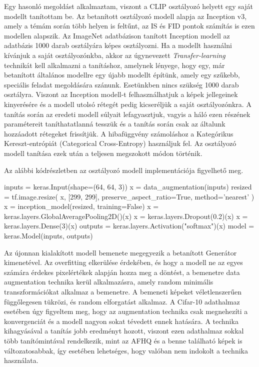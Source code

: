Egy hasonló megoldást alkalmaztam, viszont a CLIP osztályozó helyett egy saját modellt tanítottam be. Az betanított osztályozó modell alapja az Inception v3, amely a témám során több helyen is feltűnt, az IS és FID pontok számítás is ezen modellen alapszik. Az ImageNet \cite{deng2009imagenet} adatbázison tanított Inception modell az adatbázis 1000 darab osztályára képes osztályozni. Ha a modellt használni kívánjuk a saját osztályozónkba, akkor az úgynevezett \textit{Transfer-learning} technikát kell alkalmazni a tanításhoz, amelynek lényege, hogy egy, már betanított általános modellre egy újabb modellt építünk, amely egy szűkebb, speciális feladat megoldására szánunk. Esetünkben nincs szükség 1000 darab osztályra. Viszont az Inception modell-t felhasználhatjuk a képek jellegeinek kinyerésére és a modell utolsó rétegét pedig kicseréljük a saját osztályozónkra.
A tanítás során az eredeti modell súlyait lefagyasztjuk, vagyis a háló ezen részének paramétereit taníthatatlanná tesszük és a tanítás során csak az általunk hozzáadott rétegeket frissítjük.
A hibafüggvény számoláshoz a Kategórikus Kereszt-entrópiát (Categorical Cross-Entropy) használjuk fel. Az osztályozó modell tanítása ezek után a teljesen megszokott módon történik.

Az alábbi kódrészletben az osztályozó modell implementációja figyelhető meg.

\begin{python}
inputs = keras.Input(shape=(64, 64, 3))
x = data_augmentation(inputs)
resized = tf.image.resize(
    x, [299, 299],
    preserve_aspect_ratio=True, method='nearest'
)
x = inception_model(resized, training=False)
x = keras.layers.GlobalAveragePooling2D()(x)
x = keras.layers.Dropout(0.2)(x)
x = keras.layers.Dense(3)(x)
outputs = keras.layers.Activation("softmax")(x)
model = keras.Model(inputs, outputs)
\end{python}

Az újonnan kialakított modell bemenete megegyezik a betanított Generátor kimenetével. Az overfitting elkerülése érdekében, és hogy a modell ne az egyes számára érdekes pixelértékek alapján hozza meg a döntést, a bemenetre data augmentation technika kerül alkalmazásra, amely random minimális transzformációkat alkalmaz a bemenetre. A bemeneti képeket véletlenszerűen függőlegesen tükrözi, és random elforgatást alkalmaz. A Cifar-10 adathalmaz esetében úgy figyeltem meg, hogy az augmentation technika csak megnehezíti a konvergenciát és a modell nagyon sokat tévedett ennek hatására. A technika kihagyásával a tanítás jobb eredményt hozott, viszont ezen adathalmaz sokkal több tanítómintával rendelkezik, mint az AFHQ és a benne található képek is változatosabbak, így esetében lehetséges, hogy valóban nem indokolt a technika használata.

